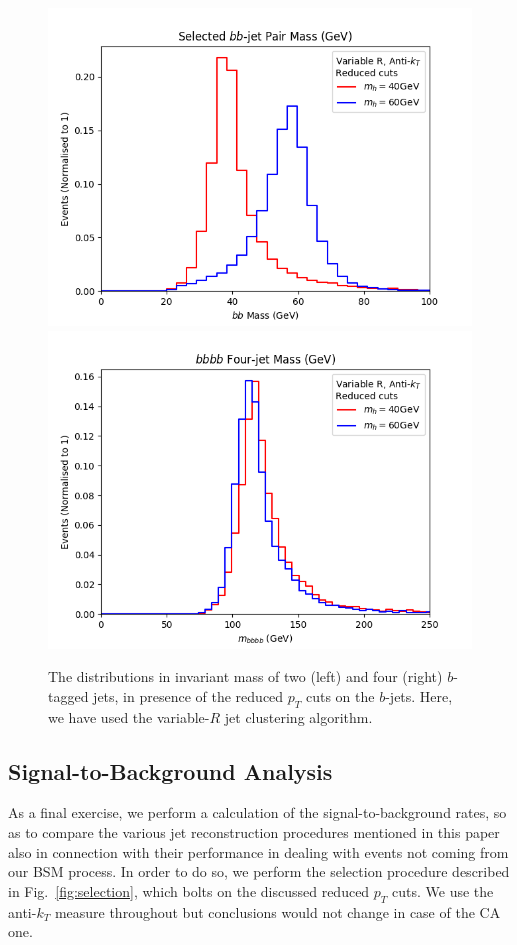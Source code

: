 \documentclass[12pt]{article}
\begin{document}
\begin{figure}[t!]
	\includegraphics[scale=0.5]{plots/bbmass_varR_lowptcut.png}
	\includegraphics[scale=0.5]{plots/bbbbmass_varR_lowptcut.png}
	\caption{The distributions in invariant mass of two (left) and four (right) $b$-tagged jets, in presence of the
  reduced $p_T$ cuts on the $b$-jets. Here, we have used the variable-$R$ jet clustering algorithm.}
\label{fig:invmass_ptcut_varR}
\end{figure}

\subsection{Signal-to-Background Analysis}
As a final exercise, we perform a calculation of the signal-to-background rates, so as to compare the various jet reconstruction procedures mentioned in this paper also in connection with their performance in dealing with events not coming from our BSM process. In order to do so, we perform the selection
procedure described in Fig.~\ref{fig:selection}, which bolts on the discussed reduced $p_T$ cuts. We use the anti-$k_T$ measure throughout but conclusions would not change in case of the CA one.
\end{document}
